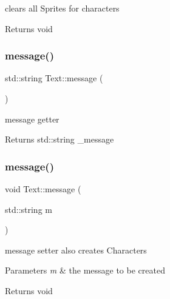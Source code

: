 clears all Sprites for characters 

\begin{DoxyReturn}{Returns}
void 
\end{DoxyReturn}
\mbox{\label{class_text_af104dcc0d17a6c0d211eebd034fd1e19}} 
\subsubsection{\texorpdfstring{message()}{message()}\hspace{0.1cm}{\footnotesize\ttfamily [1/3]}}
{\footnotesize\ttfamily std\+::string Text\+::message (\begin{DoxyParamCaption}{ }\end{DoxyParamCaption})\hspace{0.3cm}{\ttfamily [inline]}}



message getter 

\begin{DoxyReturn}{Returns}
std\+::string \+\_\+message 
\end{DoxyReturn}
\mbox{\label{class_text_abebd1a39cf62aab521a0a43657c63570}} 
\subsubsection{\texorpdfstring{message()}{message()}\hspace{0.1cm}{\footnotesize\ttfamily [2/3]}}
{\footnotesize\ttfamily void Text\+::message (\begin{DoxyParamCaption}\item[{std\+::string}]{m }\end{DoxyParamCaption})}



message setter also creates Characters 


\begin{DoxyParams}{Parameters}
{\em m} & the message to be created \\
\hline
\end{DoxyParams}
\begin{DoxyReturn}{Returns}
void 
\end{DoxyReturn}
\mbox{\label{class_text_a0138a1f302a7a68eca9373413463ae43}} 

